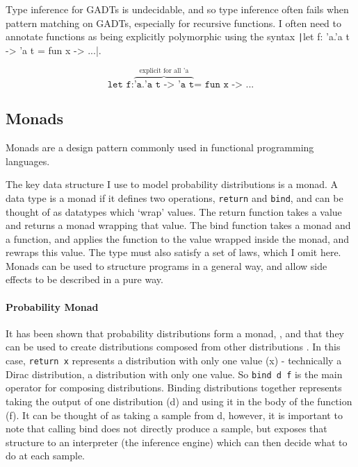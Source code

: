 Type inference for GADTs is undecidable, and so type inference often fails when pattern matching on GADTs, especially for recursive functions. I often need to annotate functions as being explicitly polymorphic using the syntax \texttt|let f: 'a.'a t -> 'a t = fun x -> ...|.

$$\texttt{let f:}\overbrace{\texttt{'a.'a t -> 'a t}}^{\text{explicit for all 'a}}\texttt{= fun x -> ...}$$
	
\subsection{Monads}
Monads are a design pattern commonly used in functional programming languages.
	
The key data structure I use to model probability distributions is a monad. A data type is a monad if it defines two operations, \texttt{return} and \texttt{bind}, and can be thought of as datatypes which `wrap' values. The return function takes a value and returns a monad wrapping that value. The bind function takes a monad and a function, and applies the function to the value wrapped inside the monad, and rewraps this value. The type must also satisfy a set of laws, which I omit here\cite{wadler1990comprehending}. Monads can be used to structure programs in a general way, and allow side effects to be described in a pure way.
	
\paragraph{Probability Monad}
It has been shown that probability distributions form a monad, \cite{giry1982categorical, jones1989probabilistic}, and that they can be used to create distributions composed from other distributions \cite{ramsey2002stochastic}. In this case, \texttt{return x} represents a distribution with only one value (x) - technically a Dirac distribution, a distribution with only one value. So \texttt{bind d f} is the main operator for composing distributions. Binding distributions together represents taking the output of one distribution (d) and using it in the body of the function (f). It can be thought of as taking a sample from d, however, it is important to note that calling bind does not directly produce a sample, but exposes that structure to an interpreter (the inference engine) which can then decide what to do at each sample.
	
	
